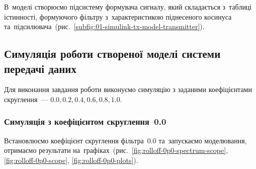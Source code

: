 \documentclass[
	a4paper,
	oneside,
	BCOR = 10mm,
	DIV = 12,
	12pt,
	headings = normal,
]{scrartcl}
\begin{document}
			В~моделі створюємо підсистему формувача сигналу, який складається з~таблиці істинності, формуючого фільтру з~характеристикою піднесеного косинуса та~підсилювача~(рис.~\ref{subfig:01-simulink-tx-model-transmitter}).

		\subsection{Симуляція роботи створеної моделі системи передачі даних}
			Для виконання завдання роботи виконуємо симуляцію з заданими коефіцієнтами скруглення~— $0.0, 0.2, 0.4, 0.6, 0.8, 1.0$.

			\clearpage
			\subsubsection{Симуляція з коефіцієнтом скруглення~0.0}
				Встановлюємо коефіцієнт скруглення фільтра~$0.0$ та~запускаємо моделювання, отримаємо результати на~графіках~(рис.~\ref{fig:rolloff-0p0-spectrum-scope}, \ref{fig:rolloff-0p0-scope}, \ref{fig:rolloff-0p0-plots}).
\end{document}
